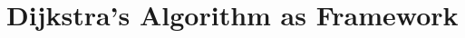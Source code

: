 \section{Dijkstra's Algorithm as Framework}

\begin{frame}{}
\end{frame}
\begin{frame}{}
\end{frame}
\begin{frame}{}
\end{frame}
\begin{frame}{}
\end{frame}
\begin{frame}{}
\end{frame}
\begin{frame}{}
\end{frame}
\begin{frame}{}
\end{frame}
\begin{frame}{}
\end{frame}
\begin{frame}{}
\end{frame}
\begin{frame}{}
\end{frame}
\begin{frame}{}
\end{frame}
